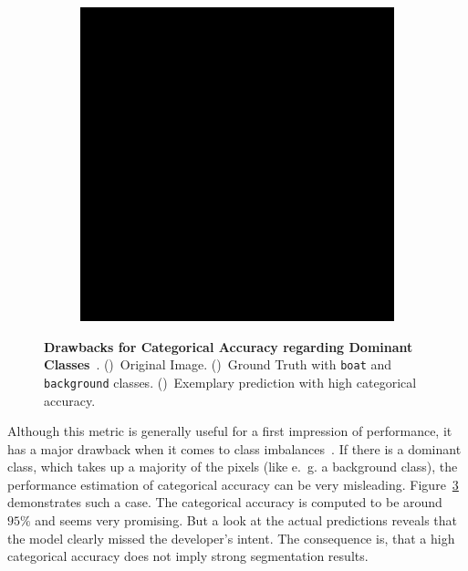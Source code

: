 \begin{figure}[h]
\begin{subfigure}{\CategoricalAccuracyImageWidth}
        \caption{}
        \label{fig:ca_truth}
    \end{subfigure}
    \hfill
    \begin{subfigure}{\CategoricalAccuracyImageWidth}
        \includegraphics[width=\textwidth]{images/categorical_accuracy_prediction}
        \caption{}
        \label{fig:ca_prediction}
    \end{subfigure}
    \hfill
    \caption[Drawbacks for Categorical Accuracy regarding Dominant Classes]
    {\textbf{Drawbacks for Categorical Accuracy regarding Dominant Classes}~\cite{tds_segmentation18}. ()~Original Image.  ()~Ground Truth with \texttt{boat} and \texttt{background} classes. ()~Exemplary prediction with high categorical accuracy.}
    \label{fig:categorical_accuracy_drawbacks}
\end{figure}

Although this metric is generally useful for a first impression of performance, it has a major drawback when it comes to class imbalances~\cite{tds_segmentation18}. If there is a dominant class, which takes up a majority of the pixels (like e.~g. a background class), the performance estimation of categorical accuracy can be very misleading. Figure~\ref{fig:categorical_accuracy_drawbacks} demonstrates such a case. The categorical accuracy is computed to be around $95\%$ and seems very promising. But a look at the actual predictions reveals that the model clearly missed the developer's intent. The consequence is, that a high categorical accuracy does not imply strong segmentation results.

